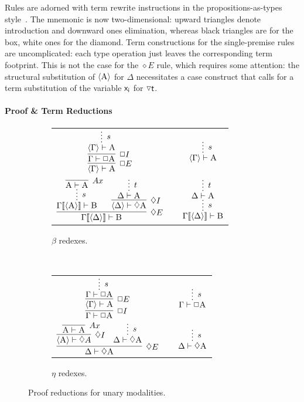 Rules are adorned with term rewrite instructions in the propositions-as-types style~\cite{wansing2002sequent}.
The mnemonic is now two-dimensional: upward triangles denote introduction and downward ones elimination, whereas black triangles are for the box, white ones for the diamond.
Term constructions for the single-premise rules are uncomplicated: each type operation just leaves the corresponding term footprint.
This is not the case for the $\diamond E$ rule, which requires some attention:
the structural substitution of $\bracket{\smallprop{A}}$ for $\Delta$ necessitates a case construct that calls for a term substitution of the variable $\mathsf{x_i}$ for $\diaelim\smallterm{t}$.


\paragraph{Proof \& Term Reductions}

\begin{figure}
	\centering
	\begin{subfigure}{1\textwidth}
	\centering
		\begin{tabularx}{0.85\textwidth}{@{}ccc@{}}
		$\infer[\Box E]{\bracket{\Gamma} \vdash \prop{A}}{
			\infer[\Box I]{\Gamma \vdash \Box \prop{A}}{
				\infer*[s]{\bracket{\Gamma} \vdash  \prop{A}}{}
			}
		}
		$
		&
		\raisebox{10pt}{$\implies$}
		&
		$\infer*[s]{\bracket{\Gamma} \vdash \prop{A}}{}
		$\\[\smallsep]
		$\infer[\diamond E]{\Gamma\ctx{\bracket{\Delta}} \vdash \prop{B}}{
			\infer*[s]{\Gamma\ctx{\bracket{\prop{A}}} \vdash \prop{B}}{
				\infer[Ax]{\prop{A} \vdash \prop{A}}{}}
			&
			\infer[\diamond I]{\bracket{\Delta} \vdash \diamond\prop{A}}{
				\infer*[t]{\Delta \vdash \prop{A}}{}
			}
		}
		$
		&
		\raisebox{20pt}{$\implies$}
		&
		$\infer*[s]{\Gamma\ctx{\bracket{\Delta}} \vdash \prop{B}}{
			\infer*[t]{\Delta \vdash \prop{A}}{}
		}
		$
		\end{tabularx}
		\caption{$\beta$ redexes.}
		\label{subfigure:modal_beta_reductions}
	\end{subfigure}\\[\midsep]
	\begin{subfigure}{1\textwidth}
		\centering
		\begin{tabularx}{0.8\textwidth}{@{}ccc@{}}
			$\infer[\Box I]{\Gamma \vdash \Box\prop{A}}{
			\infer[\Box E]{\bracket{\Gamma} \vdash \prop{A}}{
					\infer*[s]{\Gamma \vdash  \Box\prop{A}}{}
				}
			}
			$
			&
			\raisebox{5pt}{$\equiv$}
			&
			$\infer*[s]{\Gamma \vdash \Box\prop{A}}{}
			$\\[\smallsep]
			$\infer[\diamond E]{\Delta \vdash \diamond\prop{A}}{
				\infer[\diamond I]{\bracket{\prop{A}}\vdash \diamond A}{
					\infer[Ax]{\prop{A} \vdash \prop{A}}{}
				}
				&
				\infer*[s]{\Delta \vdash \diamond\prop{A}}{}
			}$
			&
			\raisebox{15pt}{$\equiv$}
			&
			$\infer*[s]{\Delta \vdash \diamond \prop{A}}{}
			$
		\end{tabularx}
		\caption{$\eta$ redexes.}
		\label{subfigure:modal_eta_reductions}
	\end{subfigure}
	\caption{Proof reductions for unary modalities.}
	\label{figure:modal_proof_reductions}
\end{figure}

